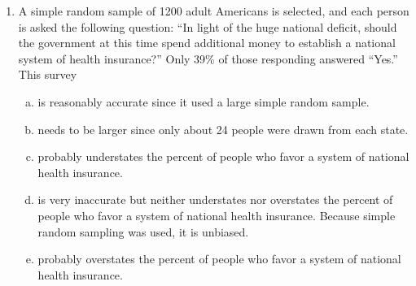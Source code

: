 \documentclass[a4paper,12pt,twoside]{book}
\begin{document}
\begin{enumerate}
    \item A simple random sample of 1200 adult Americans is selected, and each person is asked the following question: ``In light of the huge national deficit, should the government at this time spend additional money to establish a national system of health insurance?'' Only 39\% of those responding answered ``Yes.'' This survey
        \begin{enumerate}[(a)]
            \item is reasonably accurate since it used a large simple random sample.
            \item needs to be larger since only about 24 people were drawn from each state.
            \item probably understates the percent of people who favor a system of national health insurance.
            \item is very inaccurate but neither understates nor overstates the percent of people who favor a system of national health insurance. Because simple random sampling was used, it is unbiased.
            \item probably overstates the percent of people who favor a system of national health insurance.
        \end{enumerate}
    

\end{enumerate}
\end{document}
